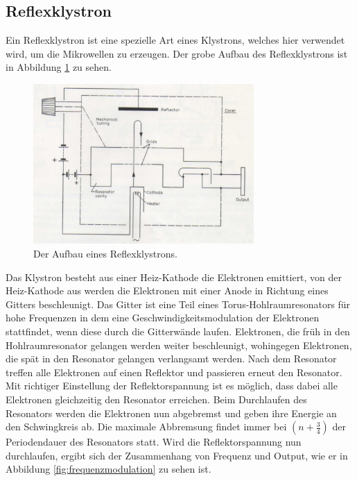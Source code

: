     \subsection{Reflexklystron}
    \label{sec:Reflexklystron}
        Ein Reflexklystron ist eine spezielle Art eines Klystrons, welches hier verwendet wird, um die Mikrowellen zu erzeugen.
        Der grobe Aufbau des Reflexklystrons ist in Abbildung \ref{fig:reflexklystron} zu sehen.
        \begin{figure}
            \centering
            \includegraphics[width = 0.75\textwidth]{bilder/Reflexklystron.png}
            \caption{Der Aufbau eines Reflexklystrons.}
            \label{fig:reflexklystron}
        \end{figure}
        Das Klystron besteht aus einer Heiz-Kathode die Elektronen emittiert, von der Heiz-Kathode aus werden die Elektronen mit einer Anode in Richtung eines Gitters beschleunigt.
        Das Gitter ist eine Teil eines Torus-Hohlraumresonators für hohe Frequenzen in dem eine Geschwindigkeitsmodulation der Elektronen stattfindet, wenn diese durch die Gitterwände laufen.
        Elektronen, die früh in den Hohlraumresonator gelangen werden weiter beschleunigt, wohingegen Elektronen, die spät in den Resonator gelangen verlangsamt werden. Nach dem Resonator treffen alle Elektronen auf einen Reflektor und passieren erneut den Resonator.
        Mit richtiger Einstellung der Reflektorspannung ist es möglich, dass dabei alle Elektronen gleichzeitig den Resonator erreichen.
        Beim Durchlaufen des Resonators werden die Elektronen nun abgebremst und geben ihre Energie an den Schwingkreis ab. Die maximale Abbremsung findet immer bei $(n + \frac{3}{4})$ der Periodendauer des Resonators statt.
        Wird die Reflektorspannung nun durchlaufen, ergibt sich der Zusammenhang von Frequenz und Output, wie er in Abbildung \ref{fig:frequenzmodulation} zu sehen ist.
